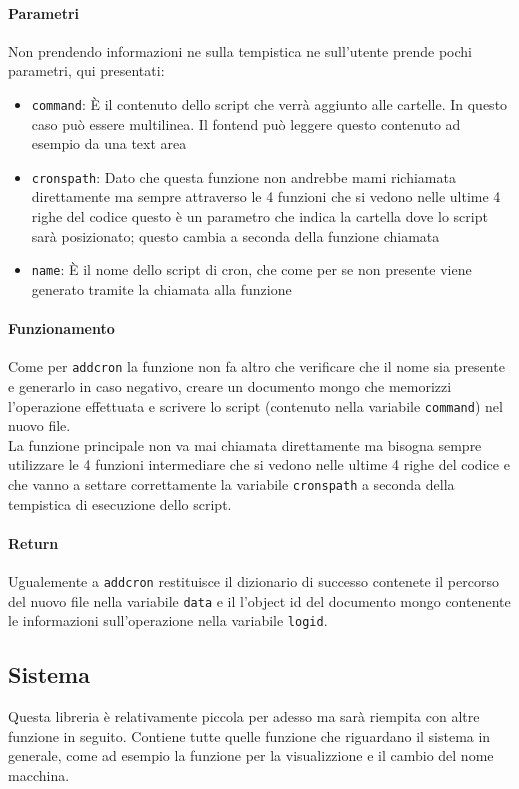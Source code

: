 \documentclass[11pt]{article}
\begin{document}
\paragraph{Parametri}
Non prendendo informazioni ne sulla tempistica ne sull'utente prende pochi parametri, qui presentati:
\begin{itemize}
	\item{\texttt{command}: È il contenuto dello script che verrà aggiunto alle cartelle. In questo
		caso può essere multilinea. Il fontend può leggere questo contenuto ad esempio da una text area}
	\item{\texttt{cronspath}: Dato che questa funzione non andrebbe mami richiamata direttamente ma sempre
		attraverso le 4 funzioni che si vedono nelle ultime 4 righe del codice questo è un parametro
		che indica la cartella dove lo script sarà posizionato; questo cambia a seconda della funzione chiamata}
	\item{\texttt{name}: È il nome dello script di cron, che come per  se non presente viene
		generato tramite la chiamata alla funzione }
\end{itemize}
\paragraph{Funzionamento}
Come per \texttt{addcron} la funzione non fa altro che verificare che il nome sia presente e generarlo in caso negativo,
creare un documento mongo che memorizzi l'operazione effettuata e scrivere lo script (contenuto nella variabile \texttt{command})
nel nuovo file.\\
La funzione principale non va mai chiamata direttamente ma bisogna sempre utilizzare le 4 funzioni intermediare che si vedono
nelle ultime 4 righe del codice e che vanno a settare correttamente la variabile \texttt{cronspath} a seconda della tempistica
di esecuzione dello script.
\paragraph{Return}
Ugualemente a \texttt{addcron} restituisce il dizionario di successo contenete il percorso del nuovo file
nella variabile \texttt{data} e il l'object id del documento mongo contenente le informazioni sull'operazione
nella variabile \texttt{logid}.

\subsection{Sistema}\label{system}
Questa libreria è relativamente piccola per adesso ma sarà riempita con altre funzione in seguito. Contiene
tutte quelle funzione che riguardano il sistema in generale, come ad esempio la funzione per la visualizzione
e il cambio del nome macchina.
\end{document}
